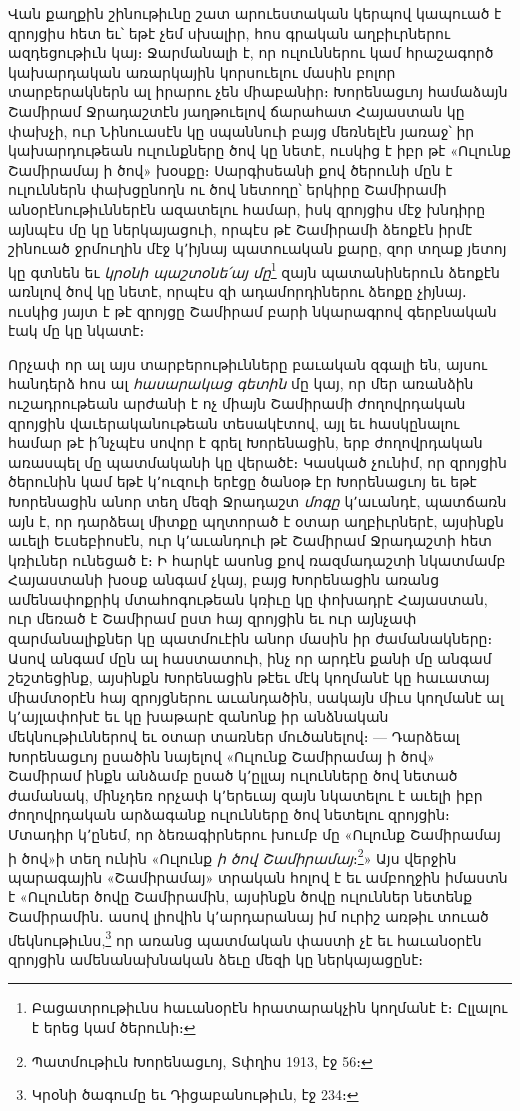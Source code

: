 \documentclass{article}
\begin{document}
{Վան քաղքին շինութիւնը շատ արուեստական կերպով կապուած է զրոյցիս հետ եւ՝ եթէ չեմ սխալիր, հոս գրական աղբիւրներու ազդեցութիւն կայ։ Ջարմանալի է, որ ուլուններու կամ հրաշագործ կախարդական առարկային կորսուելու մասին բոլոր տարբերակներն ալ իրարու չեն միաբանիր։ Խորենացւոյ համաձայն Շամիրամ Ջրադաշտէն յաղթուելով ճարահատ Հայաստան կը փախչի, ուր Նինուասէն կը սպաննուի բայց մեռնելէն յառաջ՝ իր կախարդութեան ուլունքները ծով կը նետէ, ուսկից է իբր թէ «Ուլունք Շամիրամայ ի ծով» խօսքը։ Սարգիսեանի քով ծերունի մըն է ուլուններն փախցընողն ու ծով նետողը՝ երկիրը Շամիրամի անօրէնութիւններէն ազատելու համար, իսկ զրոյցիս մէջ խնդիրը այնպէս մը կը ներկայացուի, որպէս թէ Շամիրամի ձեոքէն իրմէ շինուած ջրմուղին մէջ կ՚իյնայ պատուական քարը, զոր տղաք յետոյ կը գտնեն եւ \emph{կրօնի պաշտօնե՛այ մը}\footnote{Բացատրութիւնս հաւանօրէն հրատարակչին կողմանէ է։ Ըլլալու է երեց կամ ծերունի։} զայն պատանիներուն ձեոքէն առնլով ծով կը նետէ, որպէս զի ադամորդիներու ձեոքը չիյնայ․ ուսկից յայտ է թէ զրոյցը Շամիրամ բարի նկարագրով գերբնական էակ մը կը նկատէ։

Որչափ որ ալ այս տարբերութիւնները բաւական զգալի են, այսու հանդերձ հոս ալ \emph{հասարակաց գետին} մը կայ, որ մեր առանձին ուշադրութեան արժանի է ոչ միայն Շամիրամի ժողովրդական զրոյցին վաւերականութեան տեսակէտով, այլ եւ հասկընալու համար թէ ի՛նչպէս սովոր է գրել Խորենացին, երբ ժողովրդական առասպել մը պատմականի կը վերածէ։ Կասկած չունիմ, որ զրոյցին ծերունին կամ եթէ կ՚ուզուի երէցը ծանօթ էր Խորենացւոյ եւ եթէ Խորենացին անոր տեղ մեզի Ջրադաշտ \emph{մոգը} կ՚աւանդէ, պատճառն այն է, որ դարձեալ միտքը պղտորած է օտար աղբիւրներէ, այսինքն աւելի Եւսեբիոսէն, ուր կ՚աւանդուի թէ Շամիրամ Ջրադաշտի հետ կռիւներ ունեցած է։ Ի հարկէ ասոնց քով ռազմադաշտի նկատմամբ Հայաստանի խօսք անգամ չկայ, բայց Խորենացին առանց ամենափոքրիկ մտահոգութեան կռիւը կը փոխադրէ Հայաստան, ուր մեռած է Շամիրամ ըստ հայ զրոյցին եւ ուր այնչափ զարմանալիքներ կը պատմուէին անոր մասին իր ժամանակները։ Ասով անգամ մըն ալ հաստատուի, ինչ որ արդէն քանի մը անգամ շեշտեցինք, այսինքն Խորենացին թէեւ մէկ կողմանէ կը հաւատայ միամտօրէն հայ զրոյցներու աւանդածին, սակայն միւս կողմանէ ալ կ՚այլափոխէ եւ կը խաթարէ զանոնք իր անձնական մեկնութիւններով եւ օտար տառներ մուծանելով։ — Դարձեալ Խորենացւոյ ըսածին նայելով «Ուլունք Շամիրամայ ի ծով» Շամիրամ ինքն անձամբ ըսած կ՚ըլլայ ուլունները ծով նետած ժամանակ, մինչդեռ որչափ կ՚երեւայ զայն նկատելու է աւելի իբր ժողովրդական արձագանք ուլունները ծով նետելու զրոյցին։ Մտադիր կ՚ընեմ, որ ձեռագիրներու խումբ մը «Ուլունք Շամիրամայ ի ծով»ի տեղ ունին «Ուլունք \emph{ի ծով Շամիրամայ}։\footnote{Պատմութիւն Խորենացւոյ, Տփղիս 1913, էջ 56։}» Այս վերջին պարագային «Շամիրամայ» տրական հոլով է եւ ամբողջին իմաստն է «Ուլուներ ծովը Շամիրամին, այսինքն ծովը ուլուններ նետենք Շամիրամին․ ասով լիովին կ՚արդարանայ իմ ուրիշ առթիւ տուած մեկնութիւնս,\footnote{Կրօնի ծագումը եւ Դիցաբանութիւն, էջ 234։} որ առանց պատմական փաստի չէ եւ հաւանօրէն զրոյցին ամենանախնական ձեւը մեզի կը ներկայացընէ։

}
\end{document}
